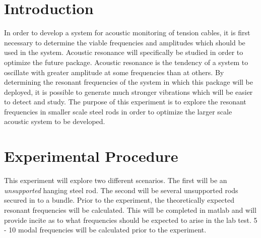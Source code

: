 \documentclass[10pt,letterpaper,titlepage]{article}
\begin{document}
\title{\Report}
\date{\today}
\author{\Author \\ \Class \\ \Professor}	

\rhead{\Last}
\lhead{\Report}
\pagestyle{fancy}

\maketitle

% 
\newpage



\newpage

\section{Introduction}

In order to develop a system for acoustic monitoring of tension cables, it is first necessary to determine the viable frequencies and amplitudes which should be used in the system. Acoustic resonance will specifically be studied in order to optimize the future package. Acoustic resonance is the tendency of a system to oscillate with greater amplitude at some frequencies than at others. By determining the resonant frequencies of the system in which this package will be deployed, it is possible to generate much stronger vibrations which will be easier to detect and study. The purpose of this experiment is to explore the resonant frequencies in smaller scale steel rods in order to optimize the larger scale acoustic system to be developed.

\section{Experimental Procedure}

This experiment will explore two different scenarios. The first will be an \emph{unsupported} hanging steel rod. The second will be several unsupported rods secured in to a bundle. Prior to the experiment, the theoretically expected resonant frequencies will be calculated. This will be completed in matlab and will provide incite as to what frequencies should be expected to arise in the lab test. 5 - 10 modal frequencies will be calculated prior to the experiment. 
\end{document}
